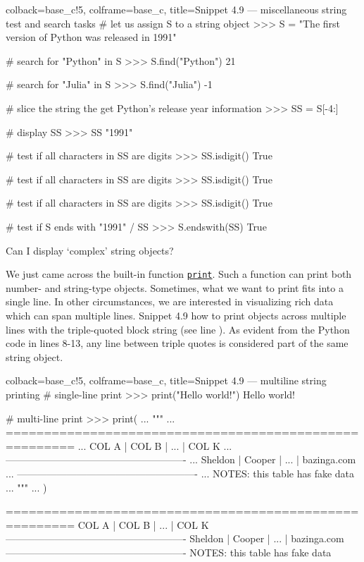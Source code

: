 \documentclass[a4paper,11pt]{book}
\newcommand{\question}[1]{%
    \begin{tcolorbox}[colback=comp_c!10,colframe=comp_c,sidebyside align=top,width=\linewidth,before skip=1ex]
        #1
    \end{tcolorbox}
    \switchcolumn%
}
\newcommand{\note}[1]{%
    \begin{tcolorbox}[colback=white!0,colframe=white!10,width=\linewidth,before skip=1ex]
        #1
    \end{tcolorbox}
}
\begin{document}
\begin{pythoncode}[linenos=true,]{colback=base_c!5, colframe=base_c, title=\sffamily Snippet 4.9 --- miscellaneous string test and search tasks}
# let us assign S to a string object
>>> S = "The first version of Python was released in 1991"

# search for "Python" in S
>>> S.find("Python")
21

# search for "Julia" in S
>>> S.find("Julia")
-1

# slice the string the get Python's release year information
>>> SS = S[-4:]

# display SS
>>> SS
"1991"

# test if all characters in SS are digits
>>> SS.isdigit()
True

# test if all characters in SS are digits
>>> SS.isdigit()
True

# test if all characters in SS are digits
>>> SS.isdigit()
True

# test if S ends with "1991" / SS
>>> S.endswith(SS)
True
\end{pythoncode}

\begin{paracol}{2}
\question{\raggedright Can I display `complex' string objects?}
\note{We just came across the built-in function \href{https://docs.python.org/3/library/functions.html\#print}{\texttt{print}}. Such a function can print both number- and string-type objects. Sometimes, what we want to print fits into a single line. In other circumstances, we are interested in visualizing rich data which can span multiple lines. Snippet 4.9 how to print objects across multiple lines with the triple-quoted block string (see line ). As evident from the Python code in lines 8-13, any line between triple quotes is considered part of the same string object.}	
\end{paracol}

\begin{pythoncode}[linenos=true,]{colback=base_c!5, colframe=base_c, title=\sffamily Snippet 4.9 --- multiline string printing}
# single-line print
>>> print("Hello world!")
Hello world!

# multi-line print
>>> print(
... """
... =======================================================
... COL A       | COL B      | ...        | COL K
... -------------------------------------------------------
... Sheldon     | Cooper     | ...        | bazinga.com
... -------------------------------------------------------
... NOTES: this table has fake data
... """
... )

=======================================================
COL A       | COL B      | ...        | COL K
-------------------------------------------------------
Sheldon     | Cooper     | ...        | bazinga.com
-------------------------------------------------------
NOTES: this table has fake data

\end{pythoncode}
\end{document}
